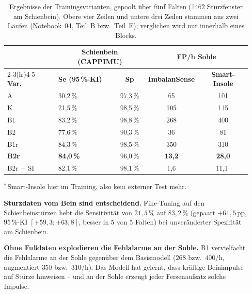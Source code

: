 \documentclass[11pt,a4paper,oneside]{report}
\begin{document}
\begin{table}[H]
\centering
\caption{Ergebnisse der Trainingsvarianten, gepoolt über fünf Falten
         (1462 Sturzfenster am Schienbein). Obere vier Zeilen und untere
         drei Zeilen stammen aus zwei Läufen (Notebook~04, Teil~B bzw.\
         Teil~E); verglichen wird nur innerhalb eines Blocks.}
\label{tab:fuss_training}
\small
\begin{tabularx}{\textwidth}{l X c c c}
\toprule
& \multicolumn{2}{c}{\textbf{Schienbein (CAPPIMU)}} & \multicolumn{2}{c}{\textbf{FP/h Sohle}} \\
\cmidrule(lr){2-3}\cmidrule(lr){4-5}
\textbf{Var.} & \textbf{Se (95\,\%-KI)} & \textbf{Sp}
& \textbf{ImbalanSense} & \textbf{Smart-Insole} \\
\midrule
A  & 30{,}2\,\% \enskip [27{,}9; 32{,}6] & 97{,}3\,\% &  65 & 101 \\
K  & 21{,}5\,\% \enskip [19{,}5; 23{,}7] & 98{,}5\,\% & 105 & 115 \\
B1 & 83{,}2\,\% \enskip [81{,}2; 85{,}0] & 98{,}8\,\% & 268 & 400 \\
B2 & 77{,}6\,\% \enskip [75{,}4; 79{,}6] & 90{,}3\,\% &  36 &  81 \\
\midrule
B1r      & 84{,}3\,\% \enskip [82{,}4; 86{,}1] & 98{,}5\,\% & 350 & 310 \\
\textbf{B2r} & \textbf{84{,}0\,\%} \enskip [82{,}0; 85{,}8] & 96{,}0\,\% & \textbf{13{,}2} & \textbf{28{,}0} \\
B2r + SI & 82{,}1\,\% \enskip [80{,}0; 84{,}0] & 98{,}1\,\% & 1{,}6 & 11{,}1$^{\dagger}$ \\
\bottomrule
\end{tabularx}

\smallskip
{\footnotesize $^{\dagger}$\,Smart-Insole hier im Training, also kein externer Test mehr.}
\end{table}

\textbf{Sturzdaten vom Bein sind entscheidend.} Fine-Tuning auf den
Schienbeinstürzen hebt die Sensitivität von $21{,}5\,\%$ auf
$83{,}2\,\%$ (gepaart $+61{,}5$\,pp, 95\,\%-KI $[+59{,}3; +63{,}8]$,
besser in 5 von 5 Falten) bei unveränderter Spezifität am Schienbein.

\textbf{Ohne Fußdaten explodieren die Fehlalarme an der Sohle.} B1
vervielfacht die Fehlalarme an der Sohle gegenüber dem Basismodell
($268$ bzw.\ $400$/h, augmentiert $350$ bzw.\ $310$/h). Das Modell hat gelernt, dass kräftige
Beinimpulse auf Stürze hinweisen -- und an der Sohle erzeugt jeder
Fersenaufsatz solche Impulse.
\end{document}
